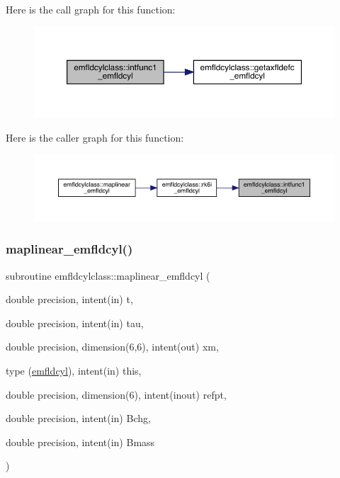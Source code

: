 Here is the call graph for this function\+:\nopagebreak
\begin{figure}[H]
\begin{center}
\leavevmode
\includegraphics[width=350pt]{namespaceemfldcylclass_ae4610622d1f42f54717c97aab5324391_cgraph}
\end{center}
\end{figure}
Here is the caller graph for this function\+:\nopagebreak
\begin{figure}[H]
\begin{center}
\leavevmode
\includegraphics[width=350pt]{namespaceemfldcylclass_ae4610622d1f42f54717c97aab5324391_icgraph}
\end{center}
\end{figure}
\mbox{\label{namespaceemfldcylclass_a6ecff12cc9860de4f3ec126083db6fea}} 
\subsubsection{\texorpdfstring{maplinear\_emfldcyl()}{maplinear\_emfldcyl()}}
{\footnotesize\ttfamily subroutine emfldcylclass\+::maplinear\+\_\+emfldcyl (\begin{DoxyParamCaption}\item[{double precision, intent(in)}]{t,  }\item[{double precision, intent(in)}]{tau,  }\item[{double precision, dimension(6,6), intent(out)}]{xm,  }\item[{type (\mbox{\hyperlink{namespaceemfldcylclass_structemfldcylclass_1_1emfldcyl}{emfldcyl}}), intent(in)}]{this,  }\item[{double precision, dimension(6), intent(inout)}]{refpt,  }\item[{double precision, intent(in)}]{Bchg,  }\item[{double precision, intent(in)}]{Bmass }\end{DoxyParamCaption})}

